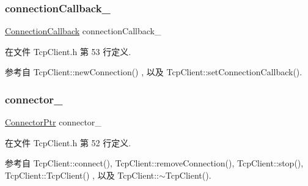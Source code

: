 \mbox{\label{classmuduo_1_1TcpClient_ae4ac7fea1abbcfb56d481dbe8ffb37e7}} 
\subsubsection{\texorpdfstring{connection\+Callback\+\_\+}{connectionCallback\_}}
{\footnotesize\ttfamily \hyperlink{namespacemuduo_ac7f7b0c9c9e96123dfea3fe120a2c404}{Connection\+Callback} connection\+Callback\+\_\+\hspace{0.3cm}{\ttfamily [private]}}



在文件 Tcp\+Client.\+h 第 53 行定义.



参考自 Tcp\+Client\+::new\+Connection() , 以及 Tcp\+Client\+::set\+Connection\+Callback().

\mbox{\label{classmuduo_1_1TcpClient_afacaad877efe5e2f583f9c03a22166c8}} 
\subsubsection{\texorpdfstring{connector\+\_\+}{connector\_}}
{\footnotesize\ttfamily \hyperlink{namespacemuduo_a144f8adea97b4c9ac75c439f6d87ae29}{Connector\+Ptr} connector\+\_\+\hspace{0.3cm}{\ttfamily [private]}}



在文件 Tcp\+Client.\+h 第 52 行定义.



参考自 Tcp\+Client\+::connect(), Tcp\+Client\+::remove\+Connection(), Tcp\+Client\+::stop(), Tcp\+Client\+::\+Tcp\+Client() , 以及 Tcp\+Client\+::$\sim$\+Tcp\+Client().

\mbox{\label{classmuduo_1_1TcpClient_a19968f50018d32ac31f5cba0195591ac}} 
